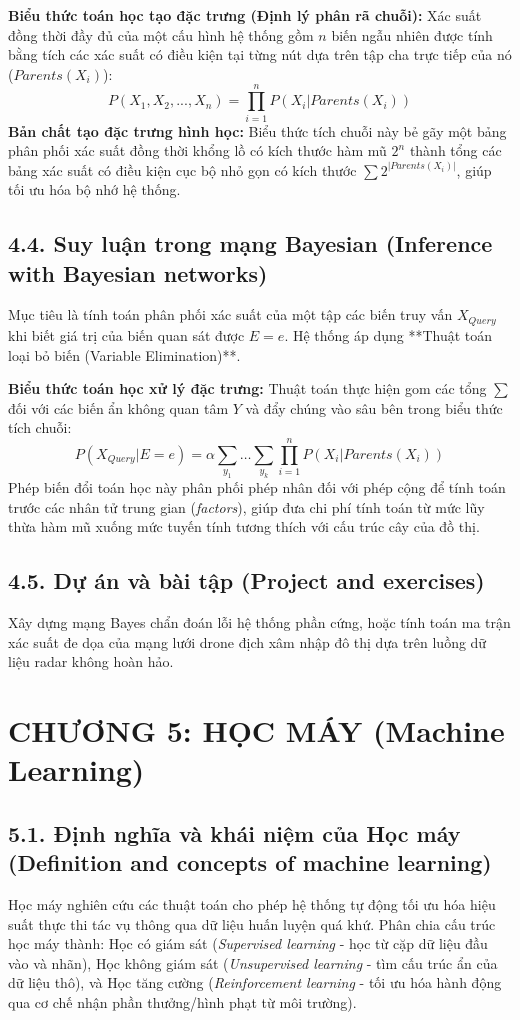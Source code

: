 \documentclass[11pt,a4paper]{article}
\begin{document}
\textbf{Biểu thức toán học tạo đặc trưng (Định lý phân rã chuỗi):} Xác suất đồng thời đầy đủ của một cấu hình hệ thống gồm $n$ biến ngẫu nhiên được tính bằng tích các xác suất có điều kiện tại từng nút dựa trên tập cha trực tiếp của nó ($Parents(X_i)$):
\begin{equation}
    P(X_1, X_2, ..., X_n) = \prod_{i=1}^{n} P(X_i | Parents(X_i))
\end{equation}
\textbf{Bản chất tạo đặc trưng hình học:} Biểu thức tích chuỗi này bẻ gãy một bảng phân phối xác suất đồng thời khổng lồ có kích thước hàm mũ $2^n$ thành tổng các bảng xác suất có điều kiện cục bộ nhỏ gọn có kích thước $\sum 2^{|Parents(X_i)|}$, giúp tối ưu hóa bộ nhớ hệ thống.

\subsection{4.4. Suy luận trong mạng Bayesian (Inference with Bayesian networks)}
Mục tiêu là tính toán phân phối xác suất của một tập các biến truy vấn $X_{Query}$ khi biết giá trị của biến quan sát được $E = e$. Hệ thống áp dụng **Thuật toán loại bỏ biến (Variable Elimination)**.

\textbf{Biểu thức toán học xử lý đặc trưng:} Thuật toán thực hiện gom các tổng $\sum$ đối với các biến ẩn không quan tâm $Y$ và đẩy chúng vào sâu bên trong biểu thức tích chuỗi:
\begin{equation}
    P(X_{Query} | E = e) = \alpha \sum_{y_1} \dots \sum_{y_k} \prod_{i=1}^{n} P(X_i | Parents(X_i))
\end{equation}
Phép biến đổi toán học này phân phối phép nhân đối với phép cộng để tính toán trước các nhân tử trung gian (\textit{factors}), giúp đưa chi phí tính toán từ mức lũy thừa hàm mũ xuống mức tuyến tính tương thích với cấu trúc cây của đồ thị.

\subsection{4.5. Dự án và bài tập (Project and exercises)}
Xây dựng mạng Bayes chẩn đoán lỗi hệ thống phần cứng, hoặc tính toán ma trận xác suất đe dọa của mạng lưới drone địch xâm nhập đô thị dựa trên luồng dữ liệu radar không hoàn hảo.

\section{CHƯƠNG 5: HỌC MÁY (Machine Learning)}

\subsection{5.1. Định nghĩa và khái niệm của Học máy (Definition and concepts of machine learning)}
Học máy nghiên cứu các thuật toán cho phép hệ thống tự động tối ưu hóa hiệu suất thực thi tác vụ thông qua dữ liệu huấn luyện quá khứ. Phân chia cấu trúc học máy thành: Học có giám sát (\textit{Supervised learning} - học từ cặp dữ liệu đầu vào và nhãn), Học không giám sát (\textit{Unsupervised learning} - tìm cấu trúc ẩn của dữ liệu thô), và Học tăng cường (\textit{Reinforcement learning} - tối ưu hóa hành động qua cơ chế nhận phần thưởng/hình phạt từ môi trường).
\end{document}
